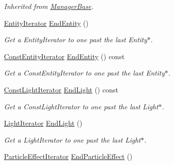 \begin{DoxyCompactItemize}
\begin{DoxyCompactList}\small\item\em Inherited from \hyperlink{classMezzanine_1_1ManagerBase}{ManagerBase}. \item\end{DoxyCompactList}\item 
\hyperlink{classMezzanine_1_1SceneManager_a1e2d6cd6454bb900b31762eab8effc8b}{EntityIterator} \hyperlink{classMezzanine_1_1SceneManager_a9e9325351566464d9009d1d6ce299f75}{EndEntity} ()
\begin{DoxyCompactList}\small\item\em Get a EntityIterator to one past the last Entity$\ast$. \item\end{DoxyCompactList}\item 
\hyperlink{classMezzanine_1_1SceneManager_a6837ab4cd75f30af8159f18db973e497}{ConstEntityIterator} \hyperlink{classMezzanine_1_1SceneManager_ad7b6c9cc55e92941f51429ec3cb5f5c6}{EndEntity} () const 
\begin{DoxyCompactList}\small\item\em Get a ConstEntityIterator to one past the last Entity$\ast$. \item\end{DoxyCompactList}\item 
\hyperlink{classMezzanine_1_1SceneManager_a04a257d3df126110aa545e856853a663}{ConstLightIterator} \hyperlink{classMezzanine_1_1SceneManager_ae51e93a3fdf6d996adc9806bb25d8ca6}{EndLight} () const 
\begin{DoxyCompactList}\small\item\em Get a ConstLightIterator to one past the last Light$\ast$. \item\end{DoxyCompactList}\item 
\hyperlink{classMezzanine_1_1SceneManager_a70382bc80d3905971a04a77d5c6bcb33}{LightIterator} \hyperlink{classMezzanine_1_1SceneManager_a08baa4f2d539cf1b6d54fce558858081}{EndLight} ()
\begin{DoxyCompactList}\small\item\em Get a LightIterator to one past the last Light$\ast$. \item\end{DoxyCompactList}\item 
\hyperlink{classMezzanine_1_1SceneManager_a5f3bd65fb09c7a08202083cc48e46fe7}{ParticleEffectIterator} \hyperlink{classMezzanine_1_1SceneManager_a9fa8eca256c321e1eaa10e935c89feb1}{EndParticleEffect} ()

\end{DoxyCompactItemize}
